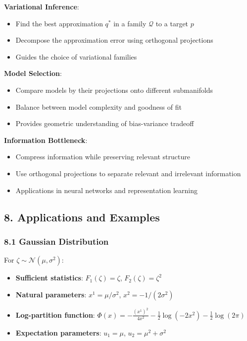 \documentclass{amsart}
\theoremstyle{plain}
\theoremstyle{definition}
\theoremstyle{remark}
\begin{document}
\textbf{Variational Inference}:

\begin{itemize}
	\item Find the best approximation $q^*$ in a family $\mathcal{Q}$ to a target $p$
	\item Decompose the approximation error using orthogonal projections
	\item Guides the choice of variational families
\end{itemize}

\textbf{Model Selection}:

\begin{itemize}
	\item Compare models by their projections onto different submanifolds
	\item Balance between model complexity and goodness of fit
	\item Provides geometric understanding of bias-variance tradeoff
\end{itemize}

\textbf{Information Bottleneck}:

\begin{itemize}
	\item Compress information while preserving relevant structure
	\item Use orthogonal projections to separate relevant and irrelevant information
	\item Applications in neural networks and representation learning
\end{itemize}

\subsection{8. Applications and Examples}

\subsubsection{8.1 Gaussian Distribution}

For $\zeta \sim \mathcal{N}(\mu, \sigma^2)$:

\begin{itemize}
	\item \textbf{Sufficient statistics}: $F_1(\zeta) = \zeta$, $F_2(\zeta) = \zeta^2$
	\item \textbf{Natural parameters}: $x^1 = \mu/\sigma^2$, $x^2 = -1/(2\sigma^2)$
	\item \textbf{Log-partition function}: $\Phi(x) = -\frac{(x^1)^2}{4x^2} - \frac{1}{2}\log(-2x^2) - \frac{1}{2}\log(2\pi)$
	\item \textbf{Expectation parameters}: $u_1 = \mu$, $u_2 = \mu^2 + \sigma^2$
\end{itemize}
\end{document}
